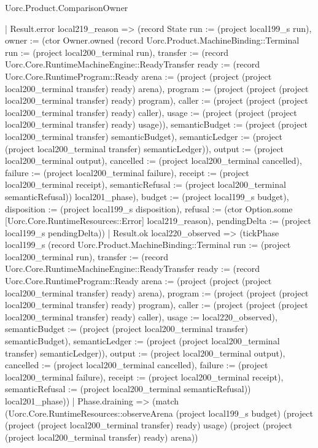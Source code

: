\begin{lexlean}{Uorc.Product.ComparisonOwner}
\begin{semanticmodule}
{      | Result.error local219_reason => (record State {run := (project local199_s run), owner := (ctor Owner.owned (record Uorc.Product.MachineBinding::Terminal {run := (project local200_terminal run), transfer := (record Uorc.Core.RuntimeMachineEngine::ReadyTransfer {ready := (record Uorc.Core.RuntimeProgram::Ready {arena := (project (project (project local200_terminal transfer) ready) arena), program := (project (project (project local200_terminal transfer) ready) program), caller := (project (project (project local200_terminal transfer) ready) caller), usage := (project (project (project local200_terminal transfer) ready) usage)}), semanticBudget := (project (project local200_terminal transfer) semanticBudget), semanticLedger := (project (project local200_terminal transfer) semanticLedger)}), output := (project local200_terminal output), cancelled := (project local200_terminal cancelled), failure := (project local200_terminal failure), receipt := (project local200_terminal receipt), semanticRefusal := (project local200_terminal semanticRefusal)}) local201_phase), budget := (project local199_s budget), disposition := (project local199_s disposition), refusal := (ctor Option.some [Uorc.Core.RuntimeResources::Error] local219_reason), pendingDelta := (project local199_s pendingDelta)})
      | Result.ok local220_observed => (tickPhase local199_s (record Uorc.Product.MachineBinding::Terminal {run := (project local200_terminal run), transfer := (record Uorc.Core.RuntimeMachineEngine::ReadyTransfer {ready := (record Uorc.Core.RuntimeProgram::Ready {arena := (project (project (project local200_terminal transfer) ready) arena), program := (project (project (project local200_terminal transfer) ready) program), caller := (project (project (project local200_terminal transfer) ready) caller), usage := local220_observed}), semanticBudget := (project (project local200_terminal transfer) semanticBudget), semanticLedger := (project (project local200_terminal transfer) semanticLedger)}), output := (project local200_terminal output), cancelled := (project local200_terminal cancelled), failure := (project local200_terminal failure), receipt := (project local200_terminal receipt), semanticRefusal := (project local200_terminal semanticRefusal)}) local201_phase))
    | Phase.draining => (match (Uorc.Core.RuntimeResources::observeArena (project local199_s budget) (project (project (project local200_terminal transfer) ready) usage) (project (project (project local200_terminal transfer) ready) arena))
}
\end{semanticmodule}
\end{lexlean}
